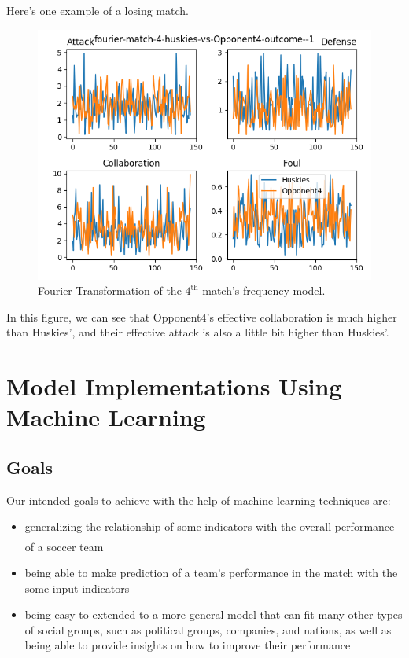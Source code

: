 \documentclass{mcmthesis}
\newcommand{\upcite}[1]{\textsuperscript{\textsuperscript{\cite{#1}}}}
\begin{document}
		Here's one example of a losing match. 
		\begin{figure}[h!]
			\centering
			\includegraphics[scale=0.7]{images/fourier-match-4-huskies-vs-Opponent4-outcome--1.png}
			\caption{Fourier Transformation of the $4^\mathrm{th}$ match's frequency model.}
		\end{figure} 
		
		In this figure, we can see that Opponent4's effective collaboration is much higher than Huskies', and their effective attack is also a little bit higher than Huskies'. 


\section{Model Implementations Using Machine Learning}

\subsection{Goals}

Our intended goals to achieve with the help of machine learning techniques are:

\begin{itemize}
    \item generalizing the relationship of some indicators with the overall
    performance of a soccer team\upcite{2}
    \item being able to make prediction of a team's performance in the match
    with the some input indicators
    \item being easy to extended to a more general model that can fit many
    other types of social groups, such as political groups, companies, and nations, as well as being able to provide insights on how to improve their
    performance
\end{itemize}
\end{document}
